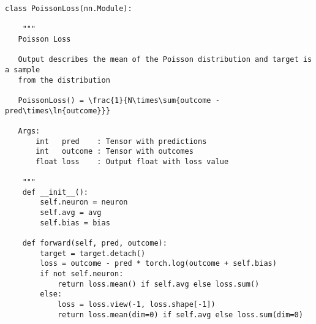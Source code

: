 \documentclass{article}
\begin{document}
\begin{lstlisting}
class PoissonLoss(nn.Module):

    """
   Poisson Loss

   Output describes the mean of the Poisson distribution and target is a sample
   from the distribution

   PoissonLoss() = \frac{1}{N\times\sum{outcome - pred\times\ln{outcome}}}

   Args:
       int   pred    : Tensor with predictions
       int   outcome : Tensor with outcomes
       float loss    : Output float with loss value

    """
    def __init__():
        self.neuron = neuron
        self.avg = avg
        self.bias = bias

    def forward(self, pred, outcome):
        target = target.detach()
        loss = outcome - pred * torch.log(outcome + self.bias)
        if not self.neuron:
            return loss.mean() if self.avg else loss.sum()
        else:
            loss = loss.view(-1, loss.shape[-1])
            return loss.mean(dim=0) if self.avg else loss.sum(dim=0)




\end{lstlisting}

\clearpage
\end{document}
